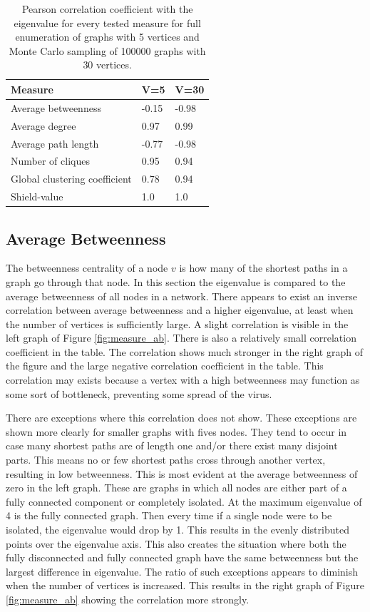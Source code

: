 \documentclass[11pt]{article}
\theoremstyle{definition}
\begin{document}
\begin{table}
\begin{center}
	\begin{tabular} { | l | l | l | }
	 \hline
	 Measure & V=5 & V=30 \\ 
	 \hline
	 Average betweenness & -0.15 & -0.98 \\
	 Average degree & 0.97 & 0.99 \\
	 Average path length & -0.77 & -0.98 \\
	 Number of cliques & 0.95 & 0.94 \\
	 Global clustering coefficient & 0.78 & 0.94 \\
	 Shield-value & 1.0 & 1.0 \\
	 \hline	 
\end{tabular}
	\caption{Pearson correlation coefficient with the eigenvalue for every tested measure for full enumeration of graphs with 5 vertices and Monte Carlo sampling of 100000 graphs with 30 vertices.}
	\label{tbl:pcc}
\end{center}
\end{table}

\subsection{Average Betweenness}

The betweenness centrality of a node $v$ is how many of the shortest paths in a graph go through that node. In this section the eigenvalue is compared to the average betweenness of all nodes in a network. There appears to exist an inverse correlation between average betweenness and a higher eigenvalue, at least when the number of vertices is sufficiently large. A slight correlation is visible in the left graph of Figure \ref{fig:measure_ab}. There is also a relatively small correlation coefficient in the table. The correlation shows much stronger in the right graph of the figure and the large negative correlation coefficient in the table. This correlation may exists because a vertex with a high betweenness may function as some sort of bottleneck, preventing some spread of the virus.

There are exceptions where this correlation does not show. These exceptions are shown more clearly for smaller graphs with fives nodes. They tend to occur in case many shortest paths are of length one and/or there exist many disjoint parts. This means no or few shortest paths cross through another vertex, resulting in low betweenness. This is most evident at the average betweenness of zero in the left graph. These are graphs in which all nodes are either part of a fully connected component or completely isolated. At the maximum eigenvalue of 4 is the fully connected graph. Then every time if a single node were to be isolated, the eigenvalue would drop by 1. This results in the evenly distributed points over the eigenvalue axis. This also creates the situation where both the fully disconnected and fully connected graph have the same betweenness but the largest difference in eigenvalue. The ratio of such exceptions appears to diminish when the number of vertices is increased. This results in the right graph of Figure \ref{fig:measure_ab} showing the correlation more strongly.
\end{document}
